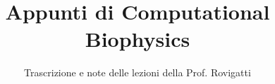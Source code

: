 \documentclass[a4paper,12pt]{article}
\title{Appunti di Computational Biophysics}
\author{Trascrizione e note delle lezioni della Prof. Rovigatti}
\date{}
\begin{document}
\maketitle
\projectintro
\tableofcontents
\newpage

\end{document}
